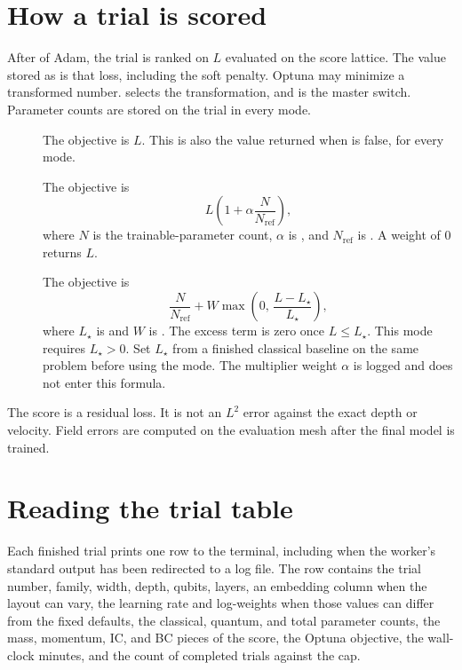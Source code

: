 \section{How a trial is scored}
\label{sec:objective}

After  of Adam, the trial is ranked on \(L\) evaluated on the score lattice.
The value stored as  is that loss, including the soft penalty.
Optuna may minimize a transformed number.
 selects the transformation, and  is the master switch.
Parameter counts are stored on the trial in every mode.

\begin{description}
\item[]
The objective is \(L\).
This is also the value returned when  is false, for every mode.

\item[]
The objective is
\[
L \left(1 + \alpha \frac{N}{N_{\mathrm{ref}}}\right),
\]
where \(N\) is the trainable-parameter count, \(\alpha\) is , and \(N_{\mathrm{ref}}\) is .
A weight of 0 returns \(L\).

\item[]
The objective is
\[
\frac{N}{N_{\mathrm{ref}}}
+ W \max\!\left(0,\, \frac{L - L_{\star}}{L_{\star}}\right),
\]
where \(L_{\star}\) is  and \(W\) is .
The excess term is zero once \(L \le L_{\star}\).
This mode requires \(L_{\star}>0\).
Set \(L_{\star}\) from a finished classical baseline on the same problem before using the mode.
The multiplier weight \(\alpha\) is logged and does not enter this formula.
\end{description}

The score is a residual loss.
It is not an \(L^{2}\) error against the exact depth or velocity.
Field errors are computed on the evaluation mesh after the final model is trained.

\section{Reading the trial table}

Each finished trial prints one row to the terminal, including when the worker's standard output has been redirected to a log file.
The row contains the trial number, family, width, depth, qubits, layers, an embedding column when the layout can vary, the learning rate and log-weights when those values can differ from the fixed defaults, the classical, quantum, and total parameter counts, the mass, momentum, IC, and BC pieces of the score, the Optuna objective, the wall-clock minutes, and the count of completed trials against the cap.

